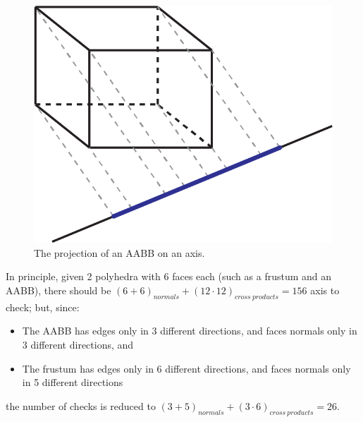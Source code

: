 \documentclass{PoliMi_MasterThesis}
\begin{document}
\begin{figure}[H]
    \centering
    \includegraphics[width=\textwidth*\real{0.45}]{Images/aabb_1d_proj.png} 
    \caption{The projection of an AABB on an axis.}
    \label{fig:aabb_1d_proj}
\end{figure}

In principle, given 2 polyhedra with 6 faces each (such as a frustum and an AABB), there should be $(6 + 6)_{normals} + (12\cdot 12)_{cross\: products} = 156$ axis to check; but, since:
\begin{itemize}
	\item The AABB has edges only in 3 different directions, and faces normals only in 3 different directions, and
	\item The frustum has edges only in 6 different directions, and faces normals only in 5 different directions
\end{itemize}
the number of checks is reduced to $(3 + 5)_{normals} + (3\cdot 6)_{cross\: products} = 26$.
\end{document}
